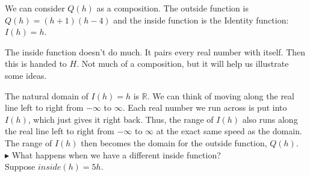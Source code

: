 \documentclass{ximera}
\begin{document}
\begin{image}
\end{image}


We can consider $Q(h)$ as a composition.  The outside function is $Q(h) = (h+1)(h-4)$ and the inside function is the Identity function: $I(h)=h$.  

The inside function doesn't do much.  It pairs every real number with itself.  Then this is handed to $H$. Not much of a composition, but it will help us illustrate some ideas.



The natural domain of $I(h)=h$ is \textbf{$\mathbb{R}$}.  We can think of moving along the real line left to right from $-\infty$ to $\infty$.  Each real number we run across is put into $I(h)$, which just gives it right back.  Thus, the range of $I(h)$ also runs along the real line left to right from $-\infty$ to $\infty$ at the exact same speed as the domain.  The range of $I(h)$ then becomes the domain for the outside function, $Q(h)$. \\



$\blacktriangleright$  What happens when we have a different inside function? \\


Suppose $inside(h) = 5h$.
\end{document}

